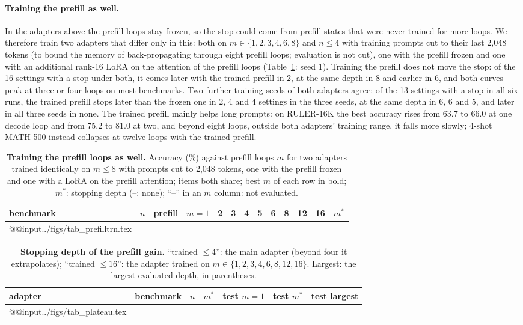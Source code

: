 \documentclass[11pt]{article}
\begin{document}
\paragraph{Training the prefill as well.} In the adapters above the prefill loops stay frozen, so the stop could come
from prefill states that were never trained for more loops. We therefore train two adapters that differ only in this:
both on $m\in\{1,2,3,4,6,8\}$ and $n\le4$ with training prompts cut to their last 2,048 tokens (to bound the memory
of back-propagating through eight prefill loops; evaluation is not cut), one with the prefill frozen and one with an
additional rank-16 LoRA on the attention of the prefill loops (Table~\ref{tab:prefilltrn}: seed 1). Training
the prefill does not move the stop: of the 16 settings with a stop under both, it comes later with the trained prefill
in 2, at the same depth in 8 and earlier in 6, and both curves peak at three or four loops on most benchmarks. Two
further training seeds of both adapters agree: of the 13 settings with a stop in all six runs, the trained prefill
stops later than the frozen one in 2, 4 and 4 settings in the three seeds, at the same depth in 6, 6 and 5, and later in
all three seeds in none. The
trained prefill mainly helps long prompts: on RULER-16K the best accuracy rises from 63.7 to 66.0 at one decode loop
and from 75.2 to 81.0 at two, and beyond eight loops, outside both adapters' training range, it falls more slowly;
4-shot MATH-500 instead collapses at twelve loops with the trained prefill.

\begin{table}[t]
\centering\footnotesize
\setlength{\tabcolsep}{4pt}
\begin{tabular}{@{}llrrrrrrrrrrr@{}}
\toprule
benchmark & $n$ & prefill & $m{=}1$ & 2 & 3 & 4 & 5 & 6 & 8 & 12 & 16 & $m^\ast$ \\
\midrule
\csname @@input\endcsname ../figs/tab_prefilltrn.tex
\bottomrule
\end{tabular}
\caption{\textbf{Training the prefill loops as well.} Accuracy (\%) against prefill loops $m$ for two adapters
trained identically on $m\le8$ with prompts cut to 2,048 tokens, one with the prefill frozen and one with a LoRA on
the prefill attention; items both share; best $m$ of each row in bold; $m^\ast$: stopping depth (--: none);
``--'' in an $m$ column: not evaluated.}
\label{tab:prefilltrn}
\end{table}

\begin{table}[t]
\centering\small
\begin{tabular}{@{}llrrrrr@{}}
\toprule
adapter & benchmark & $n$ & $m^\ast$ & test $m{=}1$ & test $m^\ast$ & test largest \\
\midrule
\csname @@input\endcsname ../figs/tab_plateau.tex
\bottomrule
\end{tabular}
\caption{\textbf{Stopping depth of the prefill gain.} ``trained $\le4$'': the main adapter (beyond four it
extrapolates); ``trained $\le16$'': the adapter trained on $m\in\{1,2,3,4,6,8,12,16\}$. Largest: the largest
evaluated depth, in parentheses.}
\label{tab:plateau}
\end{table}
\end{document}
